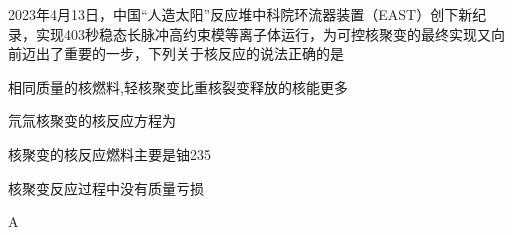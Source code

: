2023年4月13日，中国“人造太阳”反应堆中科院环流器装置（EAST）创下新纪录，实现403秒稳态长脉冲高约束模等离子体运行，为可控核聚变的最终实现又向前迈出了重要的一步，下列关于核反应的说法正确的是\paren[]
\begin{choices}
	\item 相同质量的核燃料,轻核聚变比重核裂变释放的核能更多
	\item 氘氚核聚变的核反应方程为
	\item 核聚变的核反应燃料主要是铀235
	\item 核聚变反应过程中没有质量亏损
\end{choices}
\begin{answer}
	A
\end{answer}